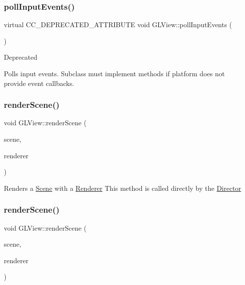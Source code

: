 \subsubsection{\texorpdfstring{poll\+Input\+Events()}{pollInputEvents()}\hspace{0.1cm}{\footnotesize\ttfamily [2/2]}}
{\footnotesize\ttfamily virtual C\+C\+\_\+\+D\+E\+P\+R\+E\+C\+A\+T\+E\+D\+\_\+\+A\+T\+T\+R\+I\+B\+U\+TE void G\+L\+View\+::poll\+Input\+Events (\begin{DoxyParamCaption}{ }\end{DoxyParamCaption})\hspace{0.3cm}{\ttfamily [virtual]}}

\begin{DoxyRefDesc}{Deprecated}
\item[\hyperlink{deprecated__deprecated000351}{Deprecated}]Polls input events. Subclass must implement methods if platform does not provide event callbacks. \end{DoxyRefDesc}
\mbox{\label{classGLView_a47d30a4a1d8ed5f7a1556c456a5af74f}} 
\subsubsection{\texorpdfstring{render\+Scene()}{renderScene()}\hspace{0.1cm}{\footnotesize\ttfamily [1/2]}}
{\footnotesize\ttfamily void G\+L\+View\+::render\+Scene (\begin{DoxyParamCaption}\item[{\hyperlink{classScene}{Scene} $\ast$}]{scene,  }\item[{\hyperlink{classRenderer}{Renderer} $\ast$}]{renderer }\end{DoxyParamCaption})}

Renders a \hyperlink{classScene}{Scene} with a \hyperlink{classRenderer}{Renderer} This method is called directly by the \hyperlink{classDirector}{Director} \mbox{\label{classGLView_a47d30a4a1d8ed5f7a1556c456a5af74f}} 
\subsubsection{\texorpdfstring{render\+Scene()}{renderScene()}\hspace{0.1cm}{\footnotesize\ttfamily [2/2]}}
{\footnotesize\ttfamily void G\+L\+View\+::render\+Scene (\begin{DoxyParamCaption}\item[{\hyperlink{classScene}{Scene} $\ast$}]{scene,  }\item[{\hyperlink{classRenderer}{Renderer} $\ast$}]{renderer }\end{DoxyParamCaption})}

